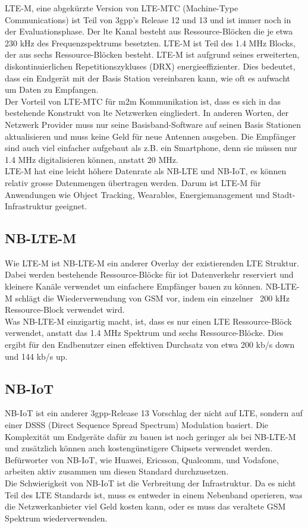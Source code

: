 LTE-M, eine abgekürzte Version von LTE-MTC (Machine-Type Communications) ist Teil von \gls{3gpp}'s Release 12 und 13 und ist immer noch in der Evaluationsphase. Der \gls{lte} Kanal besteht aus Ressource-Blöcken die je etwa 230 kHz des Frequenzspektrums besetzten. LTE-M ist Teil des 1.4 MHz Blocks, der aus sechs Ressource-Blöcken besteht. LTE-M ist aufgrund seines erweiterten, diskontinuierlichen Repetitionszykluses (DRX) energieeffizienter. Dies bedeutet, dass ein Endgerät mit der Basis Station vereinbaren kann, wie oft es aufwacht um Daten zu Empfangen.\\
Der Vorteil von LTE-MTC für \acrshort{m2m} Kommunikation ist, dass es sich in das bestehende Konstrukt von \gls{lte} Netzwerken eingliedert. In anderen Worten, der Netzwerk Provider muss nur seine Basisband-Software auf seinen Basis Stationen aktualisieren und muss keine Geld für neue Antennen ausgeben. Die Empfänger sind auch viel einfacher aufgebaut als z.B. ein Smartphone, denn sie müssen nur 1.4 MHz digitalisieren können, anstatt 20 MHz.\\
LTE-M hat eine leicht höhere Datenrate als NB-LTE und NB-IoT, es können relativ grosse Datenmengen übertragen werden. Darum ist LTE-M für Anwendungen wie Object Tracking, Wearables, Energiemanagement und Stadt-Infrastruktur geeignet. 

\subsection{NB-LTE-M}

Wie LTE-M ist NB-LTE-M ein anderer Overlay der existierenden LTE Struktur. Dabei werden bestehende Ressource-Blöcke für \gls{iot} Datenverkehr reserviert und kleinere Kanäle verwendet um einfachere Empfänger bauen zu können. NB-LTE-M schlägt die Wiederverwendung von GSM vor, indem ein einzelner ~200 kHz Ressource-Block verwendet wird.\\
Was NB-LTE-M einzigartig macht, ist, dass es nur einen LTE Ressource-Blöck verwendet, anstatt das 1.4 MHz Spektrum und sechs Ressource-Blöcke. Dies ergibt für den Endbenutzer einen effektiven Durchsatz von etwa 200 kb/s down und 144 kb/s up.

\subsection{NB-IoT}

NB-IoT ist ein anderer \gls{3gpp}-Release 13 Vorschlag der nicht auf LTE, sondern auf einer DSSS (Direct Sequence Spread Spectrum) Modulation basiert. Die Komplexität um Endgeräte dafür zu bauen ist noch geringer als bei NB-LTE-M und zusätzlich können auch kostengünstigere Chipsets verwendet werden. Befürworter von NB-IoT, wie Huawei, Ericsson, Qualcomm, und Vodafone, arbeiten aktiv zusammen um diesen Standard durchzusetzen.\\
Die Schwierigkeit von NB-IoT ist die Verbreitung der Infrastruktur. Da es nicht Teil des LTE Standards ist, muss es entweder in einem Nebenband operieren, was die Netzwerkanbieter viel Geld kosten kann, oder es muss das veraltete GSM Spektrum wiederverwenden.

